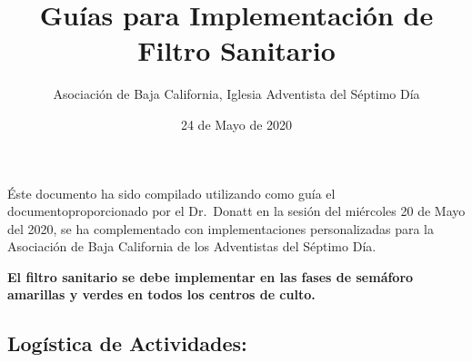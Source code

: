 \documentclass[]{article}
\title{Guías para Implementación de Filtro Sanitario}
\subtitle{Asociación de Baja California, Iglesia Adventista del Séptimo Día}
\author{}
\date{\vspace{-2.5em}24 de Mayo de 2020}
\begin{document}
\maketitle

Éste documento ha sido compilado utilizando como guía el
documentoproporcionado por el Dr.~Donatt en la sesión del miércoles 20
de Mayo del 2020, se ha complementado con implementaciones
personalizadas para la Asociación de Baja California de los Adventistas
del Séptimo Día.

\textbf{El filtro sanitario se debe implementar en las fases de semáforo
amarillas y verdes en todos los centros de culto.}

\subsection{Logística de
Actividades:}\label{loguxedstica-de-actividades}
\end{document}
